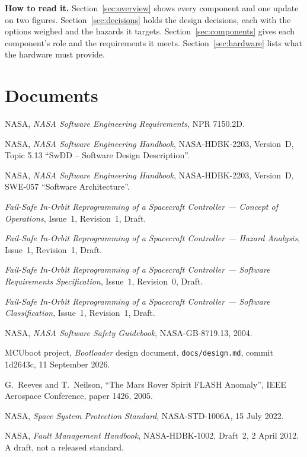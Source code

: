 \documentclass[11pt,a4paper]{article}
\begin{document}
\noindent\textbf{How to read it.} Section~\ref{sec:overview} shows every
component and one update on two figures. Section~\ref{sec:decisions} holds the design
decisions, each with the options weighed and the hazards it targets.
Section~\ref{sec:components} gives each component's role and the requirements
it meets. Section~\ref{sec:hardware} lists what the hardware must provide.

\section{Documents}
\noindent [1] NASA, \emph{NASA Software Engineering Requirements}, NPR 7150.2D.

\noindent [2] NASA, \emph{NASA Software Engineering Handbook}, NASA-HDBK-2203,
Version~D, Topic 5.13 ``SwDD -- Software Design Description''.

\noindent [3] NASA, \emph{NASA Software Engineering Handbook}, NASA-HDBK-2203,
Version~D, SWE-057 ``Software Architecture''.

\noindent [4] \emph{Fail-Safe In-Orbit Reprogramming of a Spacecraft
Controller --- Concept of Operations}, Issue~1, Revision~1, Draft.

\noindent [5] \emph{Fail-Safe In-Orbit Reprogramming of a Spacecraft
Controller --- Hazard Analysis}, Issue~1, Revision~1, Draft.

\noindent [6] \emph{Fail-Safe In-Orbit Reprogramming of a Spacecraft
Controller --- Software Requirements Specification}, Issue~1, Revision~0,
Draft.

\noindent [7] \emph{Fail-Safe In-Orbit Reprogramming of a Spacecraft
Controller --- Software Classification}, Issue~1, Revision~1, Draft.

\noindent [8] NASA, \emph{NASA Software Safety Guidebook}, NASA-GB-8719.13,
2004.

\noindent [9] MCUboot project, \emph{Bootloader} design document,
\texttt{docs/design.md}, commit 1d2643c, 11 September 2026.

\noindent [10] G.~Reeves and T.~Neilson, ``The Mars Rover Spirit FLASH
Anomaly'', IEEE Aerospace Conference, paper 1426, 2005.

\noindent [11] NASA, \emph{Space System Protection Standard}, NASA-STD-1006A,
15 July 2022.

\noindent [12] NASA, \emph{Fault Management Handbook}, NASA-HDBK-1002,
Draft~2, 2 April 2012. A draft, not a released standard.
\end{document}
